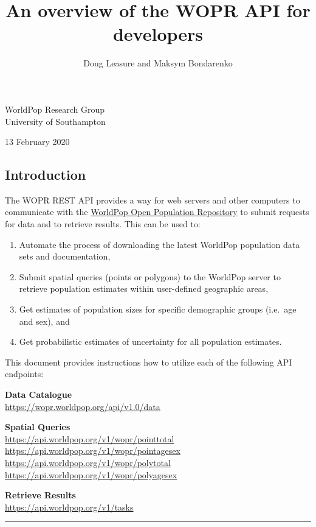 \documentclass[]{article}
\title{An overview of the WOPR API for developers}
\author{Doug Leasure and Maksym Bondarenko}
\date{}
\providecommand{\tightlist}{%
  \setlength{\itemsep}{0pt}\setlength{\parskip}{0pt}}
\begin{document}
\maketitle

WorldPop Research Group\\
University of Southampton

13 February 2020

\subsection{Introduction}\label{introduction}

The WOPR REST API provides a way for web servers and other computers to
communicate with the \href{https://wopr.worldpop.org}{WorldPop Open
Population Repository} to submit requests for data and to retrieve
results. This can be used to:

\begin{enumerate}
\def\labelenumi{\arabic{enumi}.}
\tightlist
\item
  Automate the process of downloading the latest WorldPop population
  data sets and documentation,
\item
  Submit spatial queries (points or polygons) to the WorldPop server to
  retrieve population estimates within user-defined geographic areas,
\item
  Get estimates of population sizes for specific demographic groups
  (i.e.~age and sex), and
\item
  Get probabilistic estimates of uncertainty for all population
  estimates.
\end{enumerate}

This document provides instructions how to utilize each of the following
API endpoints:

\textbf{Data Catalogue}\\
\url{https://wopr.worldpop.org/api/v1.0/data}

\textbf{Spatial Queries}\\
\url{https://api.worldpop.org/v1/wopr/pointtotal}\\
\url{https://api.worldpop.org/v1/wopr/pointagesex}\\
\url{https://api.worldpop.org/v1/wopr/polytotal}\\
\url{https://api.worldpop.org/v1/wopr/polyagesex}

\textbf{Retrieve Results}\\
\url{https://api.worldpop.org/v1/tasks}

\begin{center}\rule{0.5\linewidth}{0.5pt}\end{center}
\end{document}

